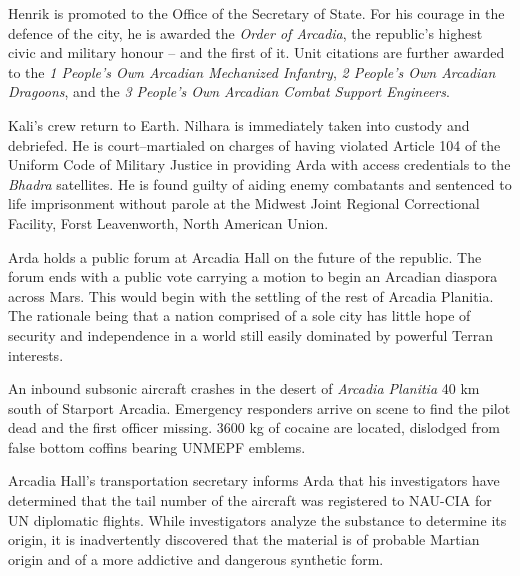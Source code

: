 Henrik is promoted to the Office of the Secretary of State. For his courage in the defence of the city, he is awarded the {\it Order of Arcadia}, the republic's highest civic and military honour -- and the first of it. Unit citations are further awarded to the {\it 1 People's Own Arcadian Mechanized Infantry}, {\it 2 People's Own Arcadian Dragoons}, and the {\it 3 People's Own Arcadian Combat Support Engineers}.
\StopTimelineDate

Kali's crew return to Earth. Nilhara is immediately taken into custody and debriefed. He is court--martialed on charges of having violated Article 104 of the Uniform Code of Military Justice in providing Arda with access credentials to the {\it Bhadra} satellites. He is found guilty of aiding enemy combatants and sentenced to life imprisonment without parole at the Midwest Joint Regional Correctional Facility, Forst Leavenworth, North American Union.
\StopTimelineDate

Arda holds a public forum at Arcadia Hall on the future of the republic. The forum ends with a public vote carrying a motion to begin an Arcadian diaspora across Mars. This would begin with the settling of the rest of Arcadia Planitia. The rationale being that a nation comprised of a sole city has little hope of security and independence in a world still easily dominated by powerful Terran interests.
\StopTimelineDate

An inbound subsonic aircraft crashes in the desert of {\it Arcadia Planitia} 40 km south of Starport Arcadia. Emergency responders arrive on scene to find the pilot dead and the first officer missing. 3600 kg of cocaine are located, dislodged from false bottom coffins bearing UNMEPF emblems.

Arcadia Hall's transportation secretary informs Arda that his investigators have determined that the tail number of the aircraft was registered to NAU-CIA for UN diplomatic flights. While investigators analyze the substance to determine its origin, it is inadvertently discovered that the material is of probable Martian origin and of a  more addictive and dangerous synthetic form.
\StopTimelineDate

